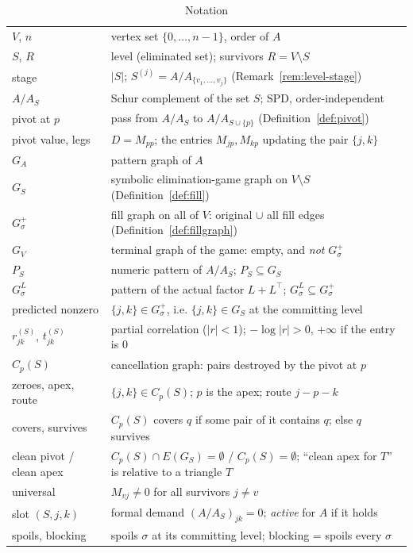 \documentclass[11pt]{article}
\theoremstyle{plain}
\theoremstyle{definition}
\theoremstyle{remark}
\begin{document}
\begin{aiblock}
\begin{table}[H]
\centering
\caption{Notation}
\label{tab:notation}
\begin{tabular}{ll}
\toprule
$V$, $n$ & vertex set $\{0,\dots,n-1\}$, order of $A$\\
$S$, $R$ & level (eliminated set); survivors $R=V\setminus S$\\
stage & $|S|$; $S^{(j)}=A/A_{\{v_1,\dots,v_j\}}$ (Remark~\ref{rem:level-stage})\\
$A/A_S$ & Schur complement of the set $S$; SPD, order-independent\\
pivot at $p$ & pass from $A/A_S$ to $A/A_{S\cup\{p\}}$ (Definition~\ref{def:pivot})\\
pivot value, legs & $D=M_{pp}$; the entries $M_{jp},M_{kp}$ updating the pair $\{j,k\}$\\
$G_A$ & pattern graph of $A$\\
$G_S$ & symbolic elimination-game graph on $V\setminus S$ (Definition~\ref{def:fill})\\
$G^+_\sigma$ & fill graph on all of $V$: original $\cup$ all fill edges (Definition~\ref{def:fillgraph})\\
$G_V$ & terminal graph of the game: empty, and \emph{not} $G^+_\sigma$\\
$P_S$ & numeric pattern of $A/A_S$; $P_S\subseteq G_S$\\
$G^L_\sigma$ & pattern of the actual factor $L+L^\top$; $G^L_\sigma\subseteq G^+_\sigma$\\
predicted nonzero & $\{j,k\}\in G^+_\sigma$, i.e. $\{j,k\}\in G_S$ at the committing level\\
$r^{(S)}_{jk}$, $t^{(S)}_{jk}$ & partial correlation ($|r|<1$); $-\log|r|>0$, $+\infty$ if the entry is $0$\\
$C_p(S)$ & cancellation graph: pairs destroyed by the pivot at $p$\\
zeroes, apex, route & $\{j,k\}\in C_p(S)$; $p$ is the apex; route $j\!-\!p\!-\!k$\\
covers, survives & $C_p(S)$ covers $q$ if some pair of it contains $q$; else $q$ survives\\
clean pivot / clean apex & $C_p(S)\cap E(G_S)=\emptyset$ / $C_p(S)=\emptyset$; ``clean apex for $T$'' is relative to a triangle $T$\\
universal & $M_{vj}\neq0$ for all survivors $j\neq v$\\
slot $(S,j,k)$ & formal demand $(A/A_S)_{jk}=0$; \emph{active} for $A$ if it holds\\
spoils, blocking & spoils $\sigma$ at its committing level; blocking = spoils every $\sigma$\\

\end{tabular}
\end{table}
\end{aiblock}
\end{document}
